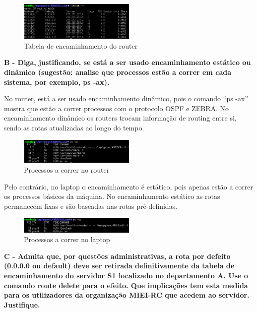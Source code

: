 \documentclass[11pt]{article}
\begin{document}
\begin{figure}[!htb]
    \centering
    \includegraphics[width=0.5\textwidth]{images/parte2/routerC.png}
    \caption{Tabela de encaminhamento do router}
\end{figure}

\vspace{0.5cm}

\textbf{B - Diga, justificando, se está a ser usado encaminhamento estático ou dinâmico (sugestão: analise que processos estão a correr em cada sistema, por exemplo, ps -ax).}

No router, está a ser usado encaminhamento dinâmico, pois o comando “ps -ax” mostra que estão a correr processos com o protocolo OSPF e ZEBRA. No encaminhamento dinâmico os routers trocam informação de routing entre si, sendo as rotas atualizadas ao longo do tempo.

\begin{figure}[!htb]
    \centering
    \includegraphics[width=0.5\textwidth]{images/parte2/ps_routerC.png}
    \caption{Processos a correr no router}
\end{figure}

Pelo contrário, no laptop o encaminhamento é estático, pois apenas estão a correr os processos básicos da máquina. No encaminhamento estático as rotas permanecem fixas e são baseadas nas rotas pré-definidas.

\begin{figure}[!htb]
    \centering
    \includegraphics[width=0.5\textwidth]{images/parte2/ps_laptopC.png}
    \caption{Processos a correr no laptop}
\end{figure}

\clearpage
\textbf{C - Admita que, por questões administrativas, a rota por defeito (0.0.0.0 ou default) deve ser retirada definitivamente da tabela de encaminhamento do servidor S1 localizado no departamento A. Use o comando route delete para o efeito.
Que implicações tem esta medida para os utilizadores da organização MIEI-RC que acedem ao servidor. Justifique.}
\end{document}
